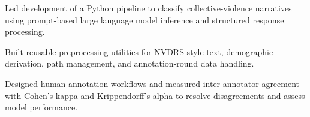 \begin{bullets}
	\item Led development of a Python pipeline to classify collective-violence narratives using prompt-based large language model inference and structured response processing.
	\item Built reusable preprocessing utilities for NVDRS-style text, demographic derivation, path management, and annotation-round data handling.
	\item Designed human annotation workflows and measured inter-annotator agreement with Cohen's kappa and Krippendorff's alpha to resolve disagreements and assess model performance.
\end{bullets}